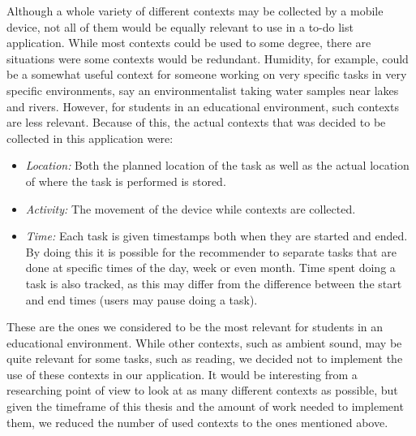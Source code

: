 Although a whole variety of different contexts may be collected by a mobile device, not all of them would be equally relevant to use in a to-do list application. While most contexts could be used to some degree, there are situations were some contexts would be redundant. Humidity, for example, could be a somewhat useful context for someone working on very specific tasks in very specific environments, say an environmentalist taking water samples near lakes and rivers. However, for students in an educational environment, such contexts are less relevant. Because of this, the actual contexts that was decided to be collected in this application were:
\begin{itemize}
	\item \emph{Location:} Both the planned location of the task as well as the actual location of where the task is performed is stored.
	\item \emph{Activity:} The movement of the device while contexts are collected.
	\item \emph{Time:} Each task is given timestamps both when they are started and ended. By doing this it is possible for the recommender to separate tasks that are done at specific times of the day, week or even month. Time spent doing a task is also tracked, as this may differ from the difference between the start and end times (users may pause doing a task).
\end{itemize}
These are the ones we considered to be the most relevant for students in an educational environment. While other contexts, such as ambient sound, may be quite relevant for some tasks, such as reading, we decided not to implement the use of these contexts in our application. It would be interesting from a researching point of view to look at as many different contexts as possible, but given the timeframe of this thesis and the amount of work needed to implement them, we reduced the number of used contexts to the ones mentioned above.


